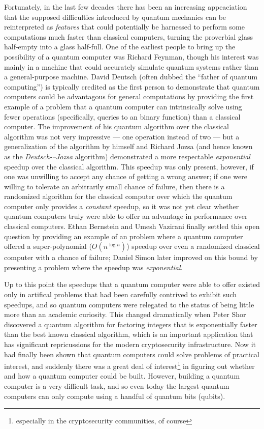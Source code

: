 \documentclass[12pt]{amsbook}
\theoremstyle{plain}
\theoremstyle{definition}
\theoremstyle{remark}
\begin{document}
Fortunately, in the last few decades there has been an increasing appeaciation that the supposed difficulties introduced by quantum mechanics can be reinterpreted as \emph{features} that could potentially be harnessed to perform some computations much faster than classical computers, turning the proverbial glass half-empty into a glass half-full.  One of the earliest people to bring up the possibility of a quantum computer was Richard Feynman, though his interest was mainly in a machine that could accurately simulate quantum systems rather than a general-purpose machine\cite{springerlink:10.1007/BF02650179}.  David Deutsch (often dubbed the ``father of quantum computing'') is typically credited as the first person to demonstrate that quantum computers could be advantagous for general computations by providing the first example of a problem that a quantum computer can intrinsically solve using fewer operations (specifically, queries to an binary function) than a classical computer\cite{Deutsch08071985}.  The improvement of his quantum algorithm over the classical algorithm was not very impressive --- one operation instead of two --- but a generalization of the algorithm by himself and Richard Jozsa (and hence known as the \emph{Deutsch-–Jozsa} algorithm) demonstrated a more respectable \emph{exponential} speedup over the classical algorithm\cite{Deutsch1992}.  This speedup was only present, however, if one was unwilling to accept any chance of getting a wrong answer;  if one were willing to tolerate an arbitrarily small chance of failure, then there is a randomized algorithm for the classical computer over which the quantum computer only provides a \emph{constant} speedup, so it was not yet clear whether quantum computers truly were able to offer an advantage in performance over classical computers.  Ethan Bernstein and Umesh Vazirani finally settled this open question by providing an example of an problem where a quantum computer offered a super-polynomial ($O(n^{\log n})$) speedup over even a randomized classical computer with a chance of failure\cite{Bernstein:1993:QCT:167088.167097};  Daniel Simon later improved on this bound by presenting a problem where the speedup was \emph{exponential}\cite{10.1109/SFCS.1994.365701}.

Up to this point the speedups that a quantum computer were able to offer existed only in artifical problems that had been carefully contrived to exhibit such speedups, and so quantum computers were relegated to the status of being little more than an academic curiosity.  This changed dramatically when Peter Shor discovered a quantum algorithm for factoring integers that is exponentially faster than the best known classical algorithm, which is an important application that has significant repricussions for the modern cryptosecurity infrastructure.  Now it had finally been shown that quantum computers could solve problems of practical interest, and suddenly there was a great deal of interest\footnote{especially in the cryptosecurity communities, of course} in figuring out whether and how a quantum computer could be built.  However, building a quantum computer is a very difficult task, and so even today the largest quantum computers can only compute using a handful of quantum bits (qubits).
\end{document}
